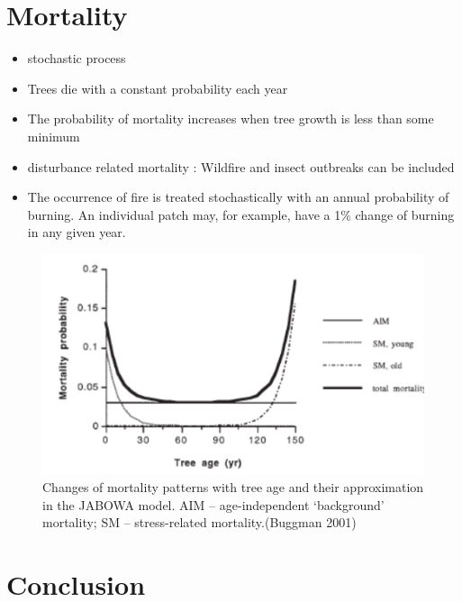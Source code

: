 \documentclass[12pt,oneside]{book}
\begin{document}
\section{Mortality}\label{mortality}

\begin{itemize}
\item
  stochastic process
\item
  Trees die with a constant probability each year
\item
  The probability of mortality increases when tree growth is less than
  some minimum
\item
  disturbance related mortality : Wildfire and insect outbreaks can be
  included
\item
  The occurrence of fire is treated stochastically with an annual
  probability of burning. An individual patch may, for example, have a
  1\% change of burning in any given year.
\end{itemize}

\begin{figure}

{\centering \includegraphics[width=0.8\linewidth]{figures/chap6/f632_mortality_jabowa} 

}

\caption{Changes of mortality patterns with tree age and their approximation in the JABOWA model. AIM – age-independent ‘background’ mortality; SM – stress-related mortality.(Buggman 2001)}\label{fig:f632}
\end{figure}

\section{Conclusion}\label{conclusion}
\end{document}
